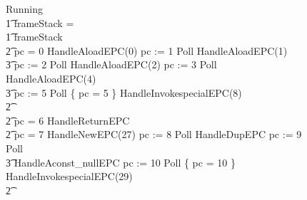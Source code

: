 \begin{figure}[t!]
  \setlength{\zedindent}{0cm}
  \setlength{\zedtab}{0.3cm}
  \setlength{\zedleftsep}{0.1cm}
  \begin{circus}
    Running \circdef \\
    \t1 \circif frameStack = \emptyset \circthen \Skip \\
    \t1 {} \circelse frameStack \neq \emptyset \circthen {} \\
    \t2 \circif pc = 0 \circthen HandleAloadEPC(0) \circseq pc := 1 \circseq Poll \circseq HandleAloadEPC(1) \circseq \\
    \t3 pc := 2 \circseq Poll \circseq HandleAloadEPC(2) \circseq pc := 3 \circseq Poll \circseq HandleAloadEPC(4) \circseq \\
    \t3 pc := 5 \circseq Poll \circseq \{ pc = 5 \} \circseq HandleInvokespecialEPC(8) \\
    \t2 {} \cdots {} \\
    \t2 {} \circelse pc = 6 \circthen HandleReturnEPC \\
    \t2 {} \circelse pc = 7 \circthen HandleNewEPC(27) \circseq pc := 8 \circseq Poll \circseq HandleDupEPC \circseq pc := 9 \circseq Poll \circseq \\
    \t3 HandleAconst\_nullEPC \circseq pc := 10 \circseq Poll \circseq \{ pc = 10 \} \circseq HandleInvokespecialEPC(29) \\
    \t2 {} \cdots {} \\

\end{circus}
\end{figure}
